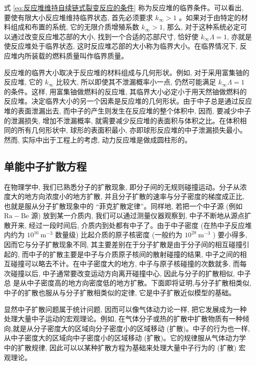 \documentclass{Sichuan Normal University}
\begin{document}
式 \eqref{eq:反应堆维持自续链式裂变反应的条件} 称为反应堆的临界条件。可以看出, 要使有限大小反应堆维持临界状态, 首先必须要求 $k_{\infty}>1$ 。如果对于由特定的材料组成和布置的系统, 它的无限介质增殖系数 $k_{\infty}>1$, 那么, 对于这种系统必定可以通过改变反应堆芯部的大小, 找到一个合适的芯部尺寸, 恰好使 $k_{\infty} \Lambda=1$, 亦就是使反应堆处于临界状态, 这时反应堆芯部的大小称为临界大小。在临界情况下, 反应堆内所装载的燃料质量叫作临界质量。

反应堆的临界大小取决于反应堆的材料组成与几何形状。例如, 对于采用富集铀的反应堆, 它的 $k_{\infty}$ 比较大, 所以即使其不泄漏概率小一点, 仍然可能满足 $k_{\infty} \Lambda=1$ 的条件。这样, 用富集铀做燃料的反应堆, 其临界大小必定小于用天然铀做燃料的反应堆。决定临界大小的另一个因素是反应堆的几何形状。由于中子总是通过反应堆的表面泄漏出去, 而中子的产生则发生在反应堆的整个体积中, 因而, 要减少中子的泄漏损失, 增加不泄漏概率, 就需要减少反应堆的表面积与体积之比。在体积相同的所有几何形状中, 球形的表面积最小, 亦即球形反应堆的中子泄漏损失最小。然而, 实际中出于工程上的考虑, 动力反应堆是做成圆柱形的。

\subsection{单能中子扩散方程}
在物理学中, 我们已熟悉分子的扩散现象, 即分子间的无规则碰撞运动。分子从浓度大的地方向浓度小的地方扩散, 并且分子扩散的速率与分子密度的梯度成正比, 也就是服从分子扩散现象中的 “菲克扩散定律”。同样地, 若把一个中子源 (例如 $\mathrm{Ra}-\mathrm{Be}$ 源) 放到某一介质内, 我们可以通过测量仪器观察到, 中子不断地从源点扩散开来, 经过一段时间后, 介质内到处都有中子了。由于中子密度 (在热中子反应堆内约为 $10^{16} \mathrm{~m}^{-3}$ 数量级) 比起介质的原子核密度 (一般约为 $10^{28} \mathrm{~m}^{-3}$ ) 要小得多, 因而它与分子扩散现象不同, 其主要差别在于分子扩散是由于分子间的相互碰撞引起的, 而中子的扩散主要是中子与介质原子核间的散射碰撞的结果, 中子之间的相互碰撞可以略去不计。在中子密度大的地方, 中子与原子核碰撞的次数就多, 而每次碰撞以后, 中子通常要改变运动方向离开碰撞中心, 因此与分子的扩散相似, 中子总
是从中子密度高的地方向密度低的地方扩散。下面即将证明,与分子扩散相类似, 中子的扩散也服从与分子扩散相类似的定律, 它是中子扩散近似模型的基础。

显然中子扩散问题属于统计问题, 因而可以像气体动力论一样, 把它发展成为一种处理大量中子运动的宏观理论。例如, 在气体分子或热的扩散中扩散物质有一种倾向,就是从分子密度大的区域向分子密度小的区域移动 (扩散)。中子的行为也一样, 从中子密度大的区域向中子密度小的区域移动 (扩散)。它的规律服从气体动力学中的扩散规律, 因此可以以某种扩散方程为基础来处理大量中子行为的 (扩散) 宏观理论。
\end{document}
